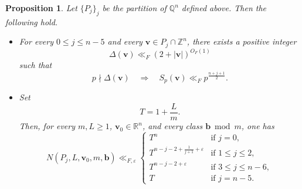 \documentclass[a4paper,11pt, twoside,reqno]{amsart}
\theoremstyle{plain}
\newtheorem{prop}[thm]{Proposition}
\theoremstyle{definition}
\theoremstyle{remark}
\newcommand{\bfb}{\bm{b}}
\newcommand{\bfv}{\bm{v}}
\newcommand{\ZZ}{\mathbb{Z}}
\newcommand{\RR}{\mathbb{R}}
\newcommand{\QQ}{\mathbb{Q}}
\newcommand{\ve}{\varepsilon}
\renewcommand{\leq}{\leqslant}
\renewcommand{\geq}{\geqslant}
\numberwithin{equation}{section}
\begin{document}
\begin{prop}
\label{PROP:Dante-partition-Pj}
Let $\{P_{j}\}_{j}$ be the partition of $\QQ^{n}$ defined above.
Then the following hold.
\begin{itemize}
\item[$i)$] For every $0\leq j\leq n-5$ and every $\bfv\in P_{j}\cap \ZZ^n$,
there exists a positive integer
$$\Delta(\bfv)\ll_{F}(2+|\bfv|)^{O_{F}(1)}$$
such that
\[
p\nmid \Delta(\bfv)
\quad\Longrightarrow\quad
S_{p}(\bfv)\ll_{F} p^{\frac{n+j+1}{2}}.
\]
\item[$ii)$] Set
\[
T=1+\frac{L}{m}.
\]
Then, for every $m,L\geq 1$, $\bfv_0\in \RR^n$, and every class $\bfb\bmod m$, one has
\begin{equation}\label{n10:progression-counts}
N(P_j,L,\bfv_0,m,\bfb)
\ll_{F,\ve}
\begin{cases}
T^{n}          &\text{if $j=0$},\\
T^{n-j-2+\frac{1}{j+1}+\ve}     &\text{if $1\leq j\leq 2$},\\
T^{n-j-2+\ve}  &\text{if $3\leq j\leq n-6$},\\
T         &\text{if $j=n-5$}.
\end{cases}
\end{equation}
\end{itemize}
\end{prop}
\end{document}
